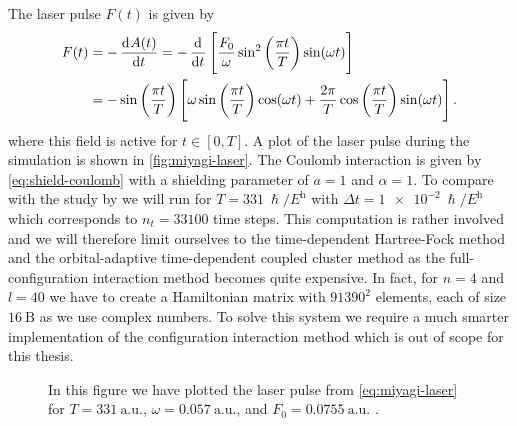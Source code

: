         The laser pulse $F(t)$ is given by \cite{miyagi_and_madsen}
        \begin{align}
            F(t)
            &= -\dod[]{A(t)}{t}
            = -\dod[]{}{t}\brak{
                \frac{F_0}{\omega}
                \sin^2\para{\frac{\pi t}{T}}
                \sin(\omega t)
            }
            \\
            &=
            -\sin\para{\frac{\pi t}{T}}\brak{
                \omega \sin\para{\frac{\pi t}{T}}
                \cos(\omega t)
                + \frac{2\pi}{T}
                \cos\para{\frac{\pi t}{T}}
                \sin(\omega t)
            }.
            \label{eq:miyagi-laser}
        \end{align}
        where this field is active for $t \in [0, T]$.
        A plot of the laser pulse during the simulation is shown in
        \autoref{fig:miyagi-laser}.
        The Coulomb interaction is given by \autoref{eq:shield-coulomb} with a
        shielding parameter of $a = 1$ and $\alpha = 1$.
        To compare with the study by \citeauthor{miyagi_and_madsen} we will run
        for $T = \SI{331}{\hslash/\hartree}$ with $\Delta t =
        \SI{1e-2}{\hslash/\hartree}$ which corresponds to $n_t = 33100$
        time steps.
        This computation is rather involved and we will therefore limit
        ourselves to the time-dependent Hartree-Fock method and the
        orbital-adaptive time-dependent coupled cluster method as the
        full-configuration interaction method becomes quite expensive.
        In fact, for $n = 4$ and $l = 40$ we have to create a Hamiltonian
        matrix with $91390^2$ elements, each of size $\SI{16}{\text{B}}$ as
        we use complex numbers.
        To solve this system we require a much smarter implementation of the
        configuration interaction method which is out of scope for this
        thesis.

        \begin{figure}
            \centering
            \caption{In this figure we have plotted the laser pulse from
            \autoref{eq:miyagi-laser} for $T = \SI{331}{\text{a.u.}}$,
            $\omega = \SI{0.057}{\text{a.u.}}$, and $F_0 =
            \SI{0.0755}{\text{a.u.}}$ \cite{miyagi_and_madsen}.}
            \label{fig:miyagi-laser}
        \end{figure}


